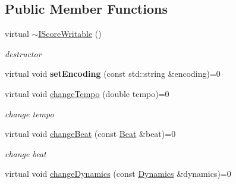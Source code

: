 \subsection*{\-Public \-Member \-Functions}
\begin{DoxyCompactItemize}
\item 
\hypertarget{classsinsy_1_1IScoreWritable_ad174b82ab93af6abd98ed224600f7b63}{virtual \hyperlink{classsinsy_1_1IScoreWritable_ad174b82ab93af6abd98ed224600f7b63}{$\sim$\-I\-Score\-Writable} ()}\label{classsinsy_1_1IScoreWritable_ad174b82ab93af6abd98ed224600f7b63}

\begin{DoxyCompactList}\small\item\em destructor \end{DoxyCompactList}\item 
\hypertarget{classsinsy_1_1IScoreWritable_ae891ee3c7cf1e2243d9d042b4c277b92}{virtual void {\bfseries set\-Encoding} (const std\-::string \&encoding)=0}\label{classsinsy_1_1IScoreWritable_ae891ee3c7cf1e2243d9d042b4c277b92}

\item 
\hypertarget{classsinsy_1_1IScoreWritable_ac7d05ec388c44450f2b036b691ff652e}{virtual void \hyperlink{classsinsy_1_1IScoreWritable_ac7d05ec388c44450f2b036b691ff652e}{change\-Tempo} (double tempo)=0}\label{classsinsy_1_1IScoreWritable_ac7d05ec388c44450f2b036b691ff652e}

\begin{DoxyCompactList}\small\item\em change tempo \end{DoxyCompactList}\item 
\hypertarget{classsinsy_1_1IScoreWritable_a8a953ab53edb884601eb19c65dee81e7}{virtual void \hyperlink{classsinsy_1_1IScoreWritable_a8a953ab53edb884601eb19c65dee81e7}{change\-Beat} (const \hyperlink{classsinsy_1_1Beat}{\-Beat} \&beat)=0}\label{classsinsy_1_1IScoreWritable_a8a953ab53edb884601eb19c65dee81e7}

\begin{DoxyCompactList}\small\item\em change beat \end{DoxyCompactList}\item 
\hypertarget{classsinsy_1_1IScoreWritable_a20a40fe2d8418648208d8e4b2dd1a31d}{virtual void \hyperlink{classsinsy_1_1IScoreWritable_a20a40fe2d8418648208d8e4b2dd1a31d}{change\-Dynamics} (const \hyperlink{classsinsy_1_1Dynamics}{\-Dynamics} \&dynamics)=0}\label{classsinsy_1_1IScoreWritable_a20a40fe2d8418648208d8e4b2dd1a31d}


\end{DoxyCompactItemize}
